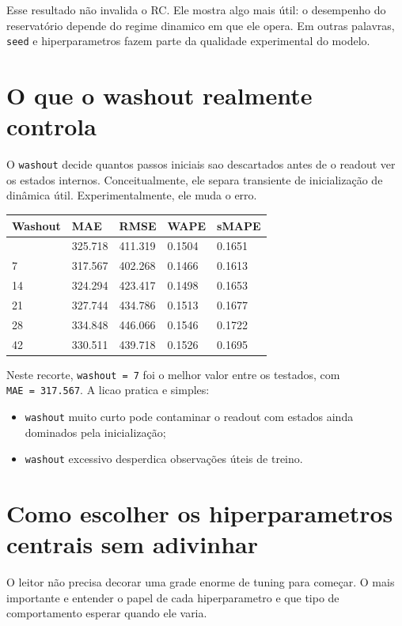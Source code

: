 \documentclass[12pt]{article}
\providecommand{\tightlist}{%
              \setlength{\itemsep}{0pt}\setlength{\parskip}{0pt}}
\begin{document}
Esse resultado não invalida o RC. Ele mostra algo mais útil: o desempenho do reservatório depende do regime dinamico em que ele opera. Em outras palavras, \texttt{seed} e hiperparametros fazem parte da qualidade experimental do modelo.

\section{O que o washout realmente controla}\label{12-o-que-o-washout-realmente-controla}

O \texttt{washout} decide quantos passos iniciais sao descartados antes de o readout ver os estados internos. Conceitualmente, ele separa transiente de inicialização de dinâmica útil. Experimentalmente, ele muda o erro.

\begin{longtable}[]{@{}lllll@{}}
\toprule\noalign{}
Washout & MAE & RMSE & WAPE & sMAPE \\
\midrule\noalign{}
\endhead
\bottomrule\noalign{}
\endlastfoot
0 & 325.718 & 411.319 & 0.1504 & 0.1651 \\
7 & 317.567 & 402.268 & 0.1466 & 0.1613 \\
14 & 324.294 & 423.417 & 0.1498 & 0.1653 \\
21 & 327.744 & 434.786 & 0.1513 & 0.1677 \\
28 & 334.848 & 446.066 & 0.1546 & 0.1722 \\
42 & 330.511 & 439.718 & 0.1526 & 0.1695 \\
\end{longtable}

Neste recorte, \texttt{washout\ =\ 7} foi o melhor valor entre os testados, com \texttt{MAE\ =\ 317.567}. A licao pratica e simples:

\begin{itemize}
\tightlist
\item
  \texttt{washout} muito curto pode contaminar o readout com estados ainda dominados pela inicialização;
\item
  \texttt{washout} excessivo desperdica observações úteis de treino.
\end{itemize}

\section{Como escolher os hiperparametros centrais sem adivinhar}\label{13-como-escolher-os-hiperparametros-centrais-sem-adivinhar}

O leitor não precisa decorar uma grade enorme de tuning para começar. O mais importante e entender o papel de cada hiperparametro e que tipo de comportamento esperar quando ele varia.
\end{document}
